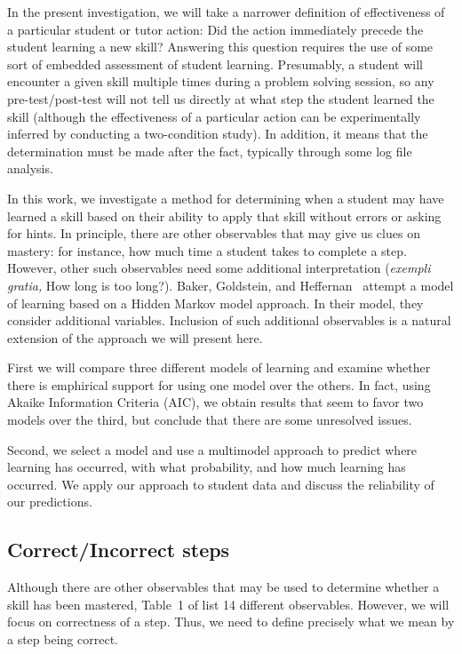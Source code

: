 \documentclass{acmlarge-edm}
\begin{document}
In the present investigation, we will take a narrower definition
of effectiveness of a particular student or tutor action:  
Did the action immediately precede the
student learning a new skill?  Answering this question requires
the use of some sort of embedded assessment of student learning.
Presumably, a student will encounter a given skill multiple times
during a problem solving session, so any pre-test/post-test will
not tell us directly at what step the student learned the skill
(although the effectiveness of a particular action can
be experimentally inferred by conducting a two-condition study).
In addition, it means that the determination must be made
after the fact, typically through some log file analysis. 

In this work, we investigate a method for determining
when a student may have learned a skill based on their
ability to apply that skill without errors or asking for hints.
In principle, there are other observables that may give us
clues on mastery:  for instance, how much time a student takes
to complete a step.  However, other such observables need
some additional interpretation 
({\em exempli gratia,} How long is too long?).
Baker, Goldstein, and Heffernan~\citeyear{baker_detecting_2010} 
attempt a model of learning based on a Hidden Markov model approach.  In their
model, they consider additional variables.  Inclusion of
such additional observables is a natural extension of
the approach we will present here.

First we will compare three different models of learning
and examine whether there is emphirical support for using
one model over the others.  In fact, using Akaike Information
Criteria (AIC), we obtain results that seem to favor two
models over the third, but conclude that there are some
unresolved issues.

Second, we select a model and use a multimodel approach
to predict where learning has occurred, with what probability,
and how much learning has occurred.  We apply our approach
to student data and discuss the reliability of our predictions.


\subsection{Correct/Incorrect steps}

Although there are other observables that may be used
to determine whether a skill has been mastered, Table~1 of
\cite{baker_detecting_2010} list 14 different observables.  
However, we will focus on correctness of a step.  Thus, we need to
define precisely what we mean by a step being correct.
\end{document}
